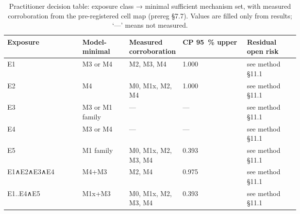 
\begin{table}[htbp]
\centering
\small
\caption{Practitioner decision table: exposure class → minimal sufficient mechanism set, with measured corroboration from the pre-registered cell map (prereg §7.7). Values are filled only from results; ‘—’ means not measured.}
\label{tab:decision}
\begin{tabular}{lp{0.16\linewidth}p{0.14\linewidth}p{0.22\linewidth}p{0.18\linewidth}}
\toprule
\textbf{Exposure} & \textbf{Model-minimal} & \textbf{Measured corroboration} & \textbf{CP 95~\% upper} & \textbf{Residual open risk} \\
\midrule
E1 & M3 or M4 & M2, M3, M4 & 1.000 & see method §11.1 \\
E2 & M4 & M0, M1x, M2, M4 & 1.000 & see method §11.1 \\
E3 & M3 or M1 family & — & — & see method §11.1 \\
E4 & M3 or M4 & — & — & see method §11.1 \\
E5 & M1 family & M0, M1x, M2, M3, M4 & 0.393 & see method §11.1 \\
E1∧E2∧E3∧E4 & M4+M3 & M2, M4 & 0.975 & see method §11.1 \\
E1..E4∧E5 & M1x+M3 & M0, M1x, M2, M3, M4 & 0.393 & see method §11.1 \\
\bottomrule
\end{tabular}
\end{table}
